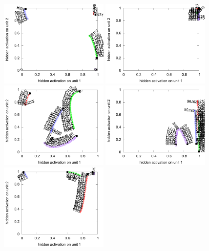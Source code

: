 \begin{figure}[H]
  \centering
  \includegraphics[width=0.48\textwidth]{img/hid-tlr-bad-static.pdf}  
  \includegraphics[width=0.48\textwidth]{img/hid-tlr-bad-tiny.pdf}  
  \includegraphics[width=0.48\textwidth]{img/hid-tlr-bad-init.pdf}  
  \includegraphics[width=0.48\textwidth]{img/hid-tlr-bad-weird.pdf}  
  \includegraphics[width=0.48\textwidth]{img/hid-tlr-good-static.pdf}  

\end{figure}
